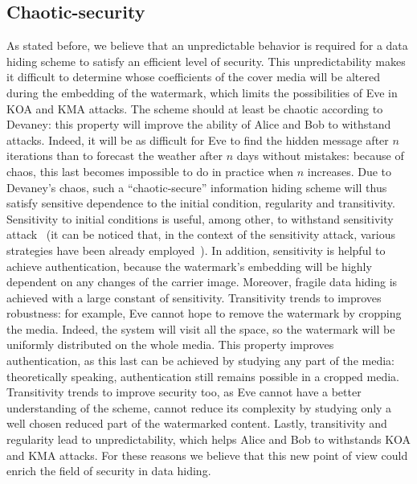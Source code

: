 \documentclass{llncs}
\begin{document}
\subsection{Chaotic-security}
\label{CS}

As stated before, we believe that an unpredictable behavior is required for a data hiding scheme to satisfy an efficient level of security. This unpredictability makes it difficult to determine whose coefficients of the cover media will be altered during the embedding of the watermark, which limits the possibilities of Eve in KOA and KMA attacks. The scheme should at least be chaotic according to Devaney: this property will improve the ability of Alice and Bob to withstand attacks. Indeed, it will be as difficult for Eve to find the hidden message after $n$ iterations than to forecast the weather after $n$ days without mistakes: because of chaos, this last becomes impossible to do in practice when $n$ increases. Due to Devaney's chaos, such a ``chaotic-secure'' information hiding scheme will thus satisfy sensitive dependence to the initial condition, regularity and transitivity. Sensitivity to initial conditions is useful, among other, to withstand sensitivity attack~\cite{ComesanaPP05} (it can be noticed that, in the context of the sensitivity attack, various strategies have been already employed~\cite{Furon08}). In addition, sensitivity is helpful to achieve authentication, because the watermark's embedding will be highly dependent on any changes of the carrier image. Moreover, fragile data hiding is achieved with a large constant of sensitivity. 
Transitivity trends to improves robustness: for example, Eve cannot hope to remove the watermark by cropping the media. Indeed, the system will visit all the space, so the watermark will be uniformly distributed on the whole media. This property improves authentication, as this last can be achieved by studying any part of the media: theoretically speaking, authentication still remains possible in a cropped media. Transitivity trends to improve security too, as Eve cannot have a better understanding of the scheme, cannot reduce its complexity by studying only a well chosen reduced part of the watermarked content. 
Lastly, transitivity and regularity lead to unpredictability, which helps Alice and Bob to withstands KOA and KMA attacks.
For these reasons we believe that this new point of view could enrich the field of security in data hiding.

\medskip
\end{document}
